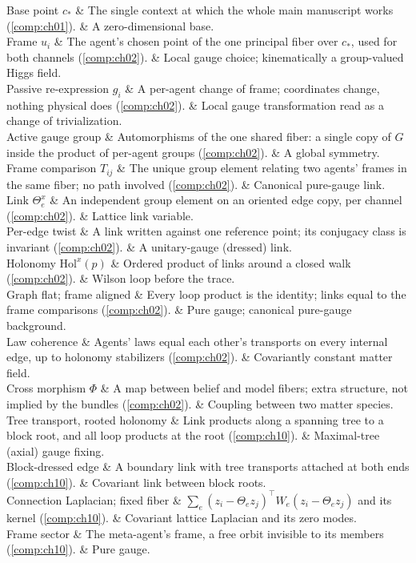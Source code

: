 \begin{decoder}
Base point $c_*$ & The single context at which the whole main manuscript works (\cref{comp:ch01}). & A zero-dimensional base. \\
Frame $u_i$ & The agent's chosen point of the one principal fiber over $c_*$, used for both channels (\cref{comp:ch02}). & Local gauge choice; kinematically a group-valued Higgs field. \\
Passive re-expression $g_i$ & A per-agent change of frame; coordinates change, nothing physical does (\cref{comp:ch02}). & Local gauge transformation read as a change of trivialization. \\
Active gauge group & Automorphisms of the one shared fiber: a single copy of $G$ inside the product of per-agent groups (\cref{comp:ch02}). & A global symmetry. \\
Frame comparison $T_{ij}$ & The unique group element relating two agents' frames in the same fiber; no path involved (\cref{comp:ch02}). & Canonical pure-gauge link. \\
Link $\Theta^x_e$ & An independent group element on an oriented edge copy, per channel (\cref{comp:ch02}). & Lattice link variable. \\
Per-edge twist & A link written against one reference point; its conjugacy class is invariant (\cref{comp:ch02}). & A unitary-gauge (dressed) link. \\
Holonomy $\mathrm{Hol}^x(p)$ & Ordered product of links around a closed walk (\cref{comp:ch02}). & Wilson loop before the trace. \\
Graph flat; frame aligned & Every loop product is the identity; links equal to the frame comparisons (\cref{comp:ch02}). & Pure gauge; canonical pure-gauge background. \\
Law coherence & Agents' laws equal each other's transports on every internal edge, up to holonomy stabilizers (\cref{comp:ch02}). & Covariantly constant matter field. \\
Cross morphism $\Phi$ & A map between belief and model fibers; extra structure, not implied by the bundles (\cref{comp:ch02}). & Coupling between two matter species. \\
Tree transport, rooted holonomy & Link products along a spanning tree to a block root, and all loop products at the root (\cref{comp:ch10}). & Maximal-tree (axial) gauge fixing. \\
Block-dressed edge & A boundary link with tree transports attached at both ends (\cref{comp:ch10}). & Covariant link between block roots. \\
Connection Laplacian; fixed fiber & $\sum_e(z_i-\Theta_ez_j)^\top W_e(z_i-\Theta_ez_j)$ and its kernel (\cref{comp:ch10}). & Covariant lattice Laplacian and its zero modes. \\
Frame sector & The meta-agent's frame, a free orbit invisible to its members (\cref{comp:ch10}). & Pure gauge. \\
\end{decoder}

